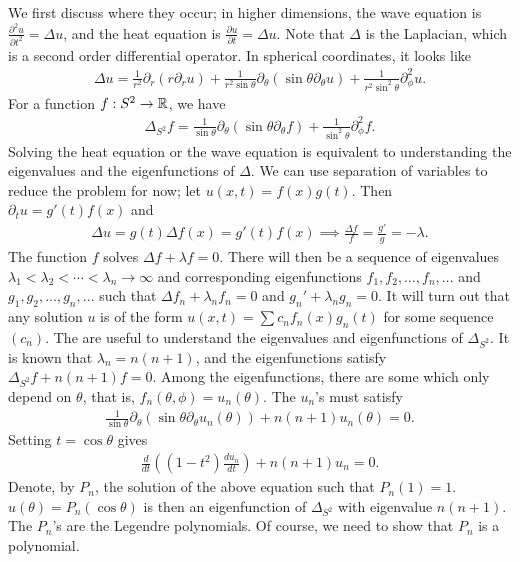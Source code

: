 We first discuss where they occur; in higher dimensions, the wave equation is $\frac{\partial^{2} u}{\partial t^{2}} = \Delta u$, and the heat equation is $\frac{\partial u}{\partial t} = \Delta u$. Note that $\Delta$ is the Laplacian, which is a second order differential operator. In spherical coordinates, it looks like
\begin{align}
    \Delta u = \frac{1}{r^{2}} \partial_{r}(r \partial_{r} u) + \frac{1}{r^{2} \sin \theta} \partial_{\theta}(\sin \theta \partial_{\theta} u) + \frac{1}{r^{2} \sin^{2} \theta} \partial_{\phi}^{2} u.
\end{align}
For a function $f:S^{2} \to \mathbb{R}$, we have
\begin{align}
    \Delta_{S^{2}} f = \frac{1}{\sin \theta} \partial_{\theta}(\sin \theta \partial_{\theta} f) + \frac{1}{\sin^{2} \theta} \partial_{\phi}^{2} f.
\end{align}
Solving the heat equation or the wave equation is equivalent to understanding the eigenvalues and the eigenfunctions of $\Delta$. We can use separation of variables to reduce the problem for now; let $u(x,t) = f(x) g(t)$. Then $\partial_{t} u = g'(t)f(x)$ and
\begin{align}
    \Delta u = g(t) \Delta f(x) = g'(t) f(x) \implies \frac{\Delta f}{f} = \frac{g'}{g} = -\lambda.
\end{align}
The function $f$ solves $\Delta f + \lambda f = 0$. There will then be a sequence of eigenvalues $\lambda_{1} < \lambda_{2} < \cdots < \lambda_{n} \to \infty$ and corresponding eigenfunctions $f_{1},f_{2},\ldots,f_{n},\ldots$ and $g_{1},g_{2},\ldots,g_{n},\ldots$ such that $\Delta f_{n} + \lambda_{n} f_{n} = 0$ and $g_{n}' + \lambda_{n} g_{n} = 0$. It will turn out that any solution $u$ is of the form $u(x,t) = \sum c_{n} f_{n}(x) g_{n}(t)$ for some sequence $(c_{n})$. The  are useful to understand the eigenvalues and eigenfunctions of $\Delta_{S^{2}}$. It is known that $\lambda_{n} = n(n+1)$, and the eigenfunctions satisfy $\Delta_{S^{2}} f + n(n+1) f = 0$. Among the eigenfunctions, there are some which only depend on $\theta$, that is, $f_{n}(\theta,\phi) = u_{n}(\theta)$. The $u_{n}$'s must satisfy
\begin{align}
    \frac{1}{\sin \theta} \partial_{\theta}(\sin \theta \partial_{\theta} u_{n}(\theta)) + n(n+1) u_{n}(\theta) = 0.
\end{align}
Setting $t = \cos \theta$ gives
\begin{align}
    \frac{d}{dt}((1-t^{2}) \frac{du_{n}}{dt}) + n(n+1) u_{n} = 0.
\end{align}
Denote, by $P_{n}$, the solution of the above equation such that $P_{n}(1) = 1$. $u(\theta) = P_{n}(\cos \theta)$ is then an eigenfunction of $\Delta_{S^{2}}$ with eigenvalue $n(n+1)$. The $P_{n}$'s are the Legendre polynomials. Of course, we need to show that $P_{n}$ is a polynomial. 

